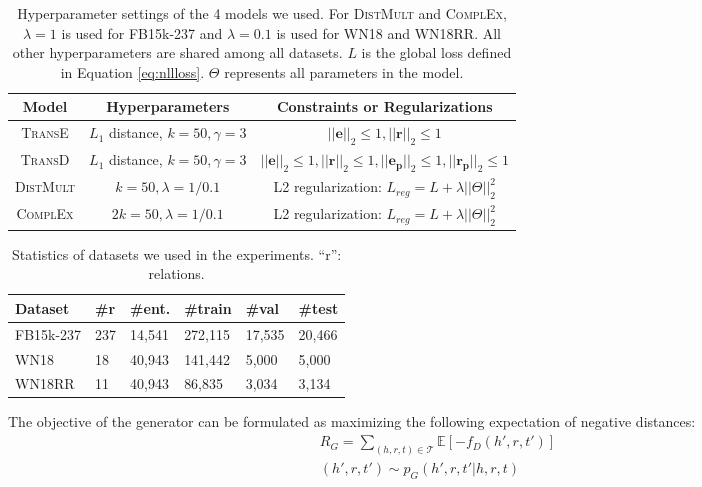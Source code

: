 \documentclass[11pt,a4paper]{article}
\begin{document}
\begin{table*}[t]
\centering
\begin{tabular}{|c|c|c|}
\hline
\textbf{Model} & \textbf{Hyperparameters} & \textbf{Constraints or Regularizations}  \\ \hline
\textsc{TransE} & $L_1$ distance, $k=50, \gamma=3$ & $||\mathbf{e}||_2\leq 1,||\mathbf{r}||_2\leq 1$ \\ \hline
\textsc{TransD} & $L_1$ distance, $k=50, \gamma=3$ & $||\mathbf{e}||_2\leq 1,||\mathbf{r}||_2\leq 1,||\mathbf{e_p}||_2\leq 1,||\mathbf{r_p}||_2\leq 1$  \\ \hline
\textsc{DistMult} & $k=50, \lambda=1/0.1$ & L2 regularization: $L_{reg}=L+\lambda||\Theta||_2^2$ \\ \hline
\textsc{ComplEx}  & $2k=50, \lambda=1/0.1$ & L2 regularization: $L_{reg}=L+\lambda||\Theta||_2^2$ \\ \hline
\end{tabular}
\caption{Hyperparameter settings of the 4 models we used. For \textsc{DistMult} and \textsc{ComplEx}, $\lambda=1$ is used for FB15k-237 and $\lambda=0.1$ is used for WN18 and WN18RR. All other hyperparameters are shared among all datasets. $L$ is the global loss defined in Equation \eqref{eq:nllloss}. $\Theta$ represents all parameters in the model.}
\label{tab:hyperparams}
\end{table*}

\begin{table}[t]
\small
\centering
\begin{tabular}{|l|l|l|l|l|l|}
\hline
\textbf{Dataset} & \textbf{\#r} & \textbf{\#ent.} & \textbf{\#train} & \textbf{\#val} & \textbf{\#test} \\ \hline
FB15k-237 & 237 & 14,541 & 272,115 & 17,535 & 20,466 \\ \hline
WN18 & 18 & 40,943 & 141,442 & 5,000 & 5,000 \\ \hline
WN18RR & 11 & 40,943 & 86,835 & 3,034 & 3,134 \\ \hline
\end{tabular}
\caption{Statistics of datasets we used in the experiments. ``r'': relations.}
\label{tab:datasets}
\end{table}

The objective of the generator can be formulated as maximizing the following expectation of negative distances:
\begin{multline}
R_G=\sum_{(h,r,t)\in\mathcal{T}}\mathbb{E}[-f_D(h',r,t')] \\
(h',r,t')\sim p_G(h',r,t'|h,r,t)
\end{multline}
\end{document}
